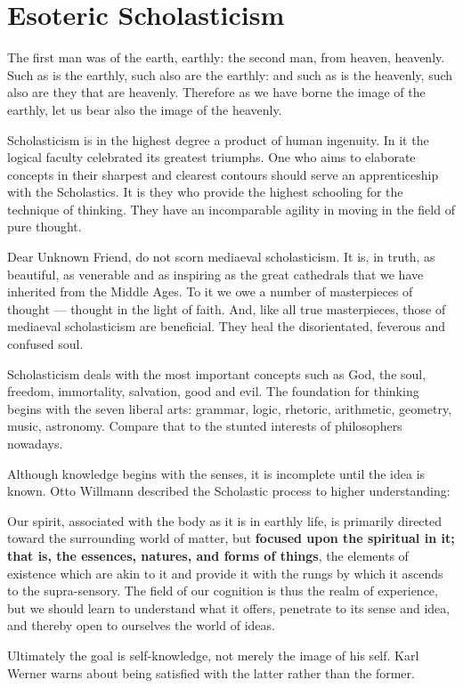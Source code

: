 \section{Esoteric Scholasticism}

\begin{quotex}
The first man was of the earth, earthly: the second man, from heaven, heavenly. Such as is the earthly, such also are the earthly: and such as is the heavenly, such also are they that are heavenly. Therefore as we have borne the image of the earthly, let us bear also the image of the heavenly. 

Scholasticism is in the highest degree a product of human ingenuity. In it the logical faculty celebrated its greatest triumphs. One who aims to elaborate concepts in their sharpest and clearest contours should serve an apprenticeship with the Scholastics. It is they who provide the highest schooling for the technique of thinking. They have an incomparable agility in moving in the field of pure thought. 

Dear Unknown Friend, do not scorn mediaeval scholasticism. It is, in truth, as beautiful, as venerable and as inspiring as the great cathedrals that we have inherited from the Middle Ages. To it we owe a number of masterpieces of thought — thought in the light of faith. And, like all true masterpieces, those of mediaeval scholasticism are beneficial. They heal the disorientated, feverous and confused soul. 

\end{quotex}
Scholasticism deals with the most important concepts such as God, the soul, freedom, immortality, salvation, good and evil. The foundation for thinking begins with the seven liberal arts: grammar, logic, rhetoric, arithmetic, geometry, music, astronomy. Compare that to the stunted interests of philosophers nowadays.

Although knowledge begins with the senses, it is incomplete until the idea is known. Otto Willmann described the Scholastic process to higher understanding:

\begin{quotex}
Our spirit, associated with the body as it is in earthly life, is primarily directed toward the surrounding world of matter, but \textbf{focused upon the spiritual in it; that is, the essences, natures, and forms of things}, the elements of existence which are akin to it and provide it with the rungs by which it ascends to the supra-sensory. The field of our cognition is thus the realm of experience, but we should learn to understand what it offers, penetrate to its sense and idea, and thereby open to ourselves the world of ideas. 

\end{quotex}
Ultimately the goal is self-knowledge, not merely the image of his self. Karl Werner warns about being satisfied with the latter rather than the former.

